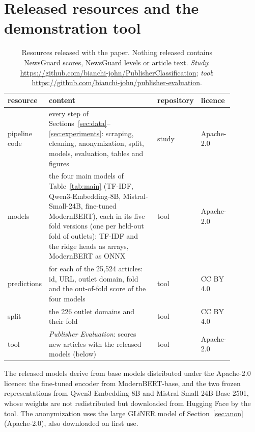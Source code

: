 \documentclass[11pt,a4paper]{article}
\begin{document}
\section{Released resources and the demonstration tool}\label{app:tool}
\begin{table}[t]
\centering\small
\caption{Resources released with the paper. Nothing released contains NewsGuard scores, NewsGuard levels or article
text. \emph{Study}: \url{https://github.com/bianchi-john/PublisherClassification}; \emph{tool}:
\url{https://github.com/bianchi-john/publisher-evaluation}.}\label{tab:release}
\begin{tabular}{p{0.15\linewidth}p{0.50\linewidth}p{0.11\linewidth}p{0.12\linewidth}}
\toprule
resource & content & repository & licence \\
\midrule
pipeline code & every step of Sections~\ref{sec:data}--\ref{sec:experiments}: scraping, cleaning, anonymization,
  split, models, evaluation, tables and figures & study & Apache-2.0 \\
models & the four main models of Table~\ref{tab:main} (TF-IDF, Qwen3-Embedding-8B, Mistral-Small-24B,
  fine-tuned ModernBERT), each in its five fold versions (one per held-out fold of outlets):
  TF-IDF and the ridge heads as arrays, ModernBERT as ONNX & tool & Apache-2.0 \\
predictions & for each of the 25,524 articles: id, URL, outlet domain, fold and the out-of-fold score of the four
  models & tool & CC BY 4.0 \\
split & the 226 outlet domains and their fold & tool & CC BY 4.0 \\
tool & \emph{Publisher Evaluation}: scores new articles with the released models (below) & tool & Apache-2.0 \\
\bottomrule
\end{tabular}
\end{table}

The released models derive from base models distributed under the Apache-2.0 licence: the fine-tuned encoder from
ModernBERT-base, and the two frozen representations from Qwen3-Embedding-8B and Mistral-Small-24B-Base-2501, whose
weights are not redistributed but downloaded from Hugging Face by the tool. The anonymization uses the large
GLiNER model of Section~\ref{sec:anon} (Apache-2.0), also downloaded on first use.
\end{document}
